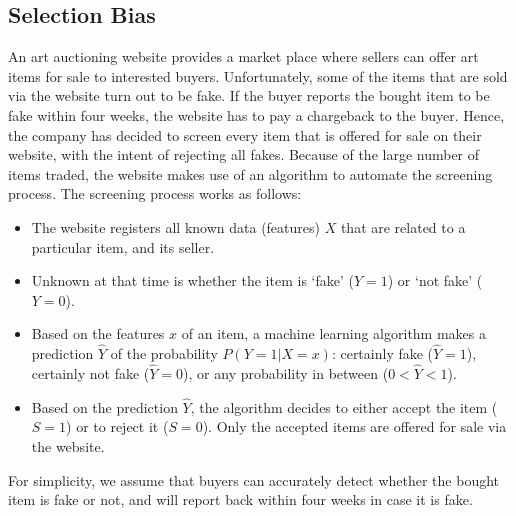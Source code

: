 \subsection{Selection Bias}

An art auctioning website provides a market place where sellers can offer
art items for sale to interested buyers.
Unfortunately, some of the items that are sold via the website turn out to be fake. 
If the buyer reports the bought item to be fake within four weeks, 
the website has to pay a chargeback to the buyer.
Hence, the company has decided to screen every item that is offered for sale 
on their website, with the intent of rejecting all fakes.
Because of the large number of items traded, the website makes use of an algorithm
to automate the screening process. The screening process works as follows:
\begin{itemize}
  \item The website registers all known data (features) $X$ that are related to a particular item, and its seller.%
  \item Unknown at that time is whether the item is `fake' ($Y=1$) or `not fake' ($Y=0$).
  \item Based on the features $x$ of an item, a machine learning algorithm makes a prediction $\hat{Y}$ of the probability $P(Y=1|X=x)$: certainly fake ($\hat{Y}=1$), certainly not fake ($\hat{Y}=0$), or any probability in between ($0 < \hat{Y} < 1$).
  \item Based on the prediction $\hat{Y}$, the algorithm decides to either accept the item ($S=1$) or to reject it ($S=0$). Only the accepted items are offered for sale via the website.
\end{itemize}
For simplicity, we assume that buyers can accurately detect whether the bought item is fake or not, and will report back within four weeks in case it is fake.

